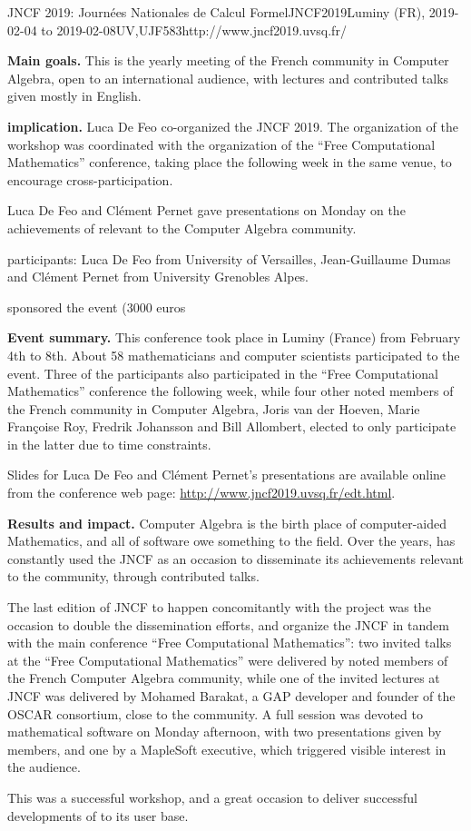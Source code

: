 \begin{event}{JNCF 2019: Journées Nationales de Calcul Formel}{JNCF2019}{Luminy (FR),
  2019-02-04 to
  2019-02-08}{UV,UJF}{58}{3}{http://www.jncf2019.uvsq.fr/}
  
\textbf{Main goals.} This is the yearly meeting of the French community in
Computer Algebra, open to an international audience, with lectures and
contributed talks given mostly in English.

\textbf{\ODK implication.} Luca De Feo co-organized the JNCF 2019. The
organization of the workshop was coordinated with the organization of
the ``Free Computational Mathematics'' conference, taking place the
following week in the same venue, to encourage cross-participation.

Luca De Feo and Clément Pernet gave presentations on Monday on the
achievements of \ODK relevant to the Computer Algebra
community.

\ODK participants: Luca De Feo from University of Versailles,
Jean-Guillaume Dumas and Clément Pernet from University Grenobles
Alpes.

\ODK sponsored the event (3000 euros %

\textbf{Event summary.} This conference took place in Luminy (France) from
February 4th to 8th. About 58 mathematicians and computer scientists
participated to the event. Three of the participants also participated
in the ``Free Computational Mathematics'' conference the following
week, while four other noted members of the French community in
Computer Algebra, Joris van der Hoeven, Marie Françoise Roy, Fredrik
Johansson and Bill Allombert, elected to only participate in the latter
due to time constraints.

Slides for Luca De Feo and Clément Pernet's presentations are
available online from the conference web page:
\url{http://www.jncf2019.uvsq.fr/edt.html}.

\textbf{Results and impact.} Computer Algebra is the birth place of
computer-aided Mathematics, and all of \ODK software owe something to
the field. Over the years, \ODK has constantly used the JNCF as an
occasion to disseminate its achievements relevant to the community,
through contributed talks.

The last edition of JNCF to happen concomitantly with the project was
the occasion to double the dissemination efforts, and organize the
JNCF in tandem with the main \ODK conference ``Free Computational
Mathematics'': two invited talks at the ``Free Computational
Mathematics'' were delivered by noted members of the French Computer
Algebra community, while one of the invited lectures at JNCF was
delivered by Mohamed Barakat, a GAP developer and founder of the OSCAR
consortium, close to the \ODK community. A full session was devoted to
mathematical software on Monday afternoon, with two presentations
given by \ODK members, and one by a MapleSoft executive, which
triggered visible interest in the audience.

This was a successful workshop, and a great occasion to deliver 
successful developments of \ODK to its user base.
\end{event}
